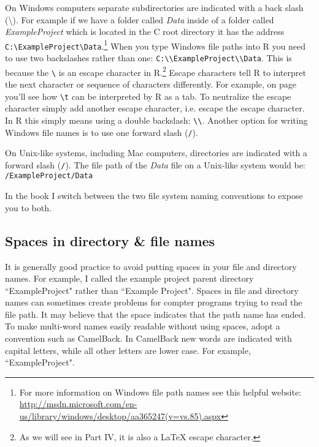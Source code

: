 On Windows computers separate subdirectories are indicated with a back slash (\textbackslash{}). For example if we have a folder called {\emph{Data}} inside of a folder called {\emph{ExampleProject}} which is located in the C root directory it has the address \texttt{C:\textbackslash{}ExampleProject\textbackslash{}Data}.\footnote{For more information on Windows file path names see this helpful website: \url{http://msdn.microsoft.com/en-us/library/windows/desktop/aa365247(v=vs.85).aspx}} When you type Windows file paths into R you need to use two backslashes rather than one: \texttt{C:\textbackslash{}\textbackslash{}ExampleProject\textbackslash{}\textbackslash{}Data}. This is because the \texttt{\textbackslash{}} is an escape character in R.\footnote{As we will see in Part IV, it is also a LaTeX escape character.} Escape characters tell R to interpret the next character or sequence of characters differently. For example, on page \pageref{TSVEscape} you'll see how \texttt{\textbackslash{}t} can be interpreted by R as a tab. To neutralize the escape character simply add another escape character, i.e. escape the escape character. In R this simply means using a double backslash: \texttt{\textbackslash{}\textbackslash{}}. Another option for writing Windows file names is to use one forward slash (\texttt{/}).  

On Unix-like systems, including Mac computers, directories are indicated with a forward slash (\texttt{/}). The file path of the {\emph{Data}} file on a Unix-like system would be: \texttt{/ExampleProject/Data}

In the book I switch between the two file system naming conventions to expose you to both.

\subsection{Spaces in directory \& file names}

It is generally good practice to avoid putting spaces in your file and directory names. For example, I called the example project parent directory ``ExampleProject" rather than ``Example Project". Spaces in file and directory names can sometimes create problems for compter programs trying to read the file path. It may believe that the space indicates that the path name has ended. To make multi-word names easily readable without using spaces, adopt a convention such as CamelBack. In CamelBack new words are indicated with capital letters, while all other letters are lower case. For example, ``ExampleProject".

